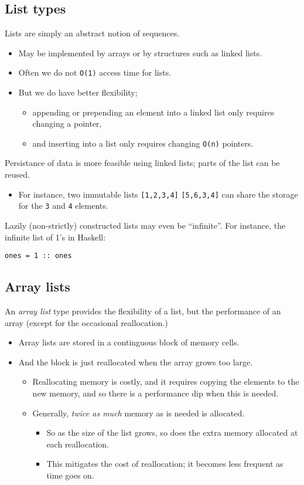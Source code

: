 \documentclass[11pt]{article}
\theoremstyle{definition}
\begin{document}
\subsection{List types}
\label{sec:org86a2905}

Lists are simply an abstract notion of sequences.
\begin{itemize}
\item May be implemented by arrays or by structures such as linked lists.
\item Often we do not \texttt{O(1)} access time for lists.
\item But we do have better flexibility;
\begin{itemize}
\item appending or prepending an element into a linked list
only requires changing a pointer,
\item and inserting into a list only requires changing \texttt{O(n)} pointers.
\end{itemize}
\end{itemize}

Persistance of data is more feasible using linked lists;
parts of the list can be reused.
\begin{itemize}
\item For instance, two immutable lists \texttt{[1,2,3,4]} \texttt{[5,6,3,4]} can share
the storage for the \texttt{3} and \texttt{4} elements.
\end{itemize}

Lazily (non-strictly) constructed lists may even be “infinite”.
For instance, the infinite list of 1's in Haskell:
\begin{verbatim}
ones = 1 :: ones
\end{verbatim}

\subsection{Array lists}
\label{sec:org1e6ac91}

An \emph{array list} type provides the flexibility of a list,
but the performance of an array (except for the occasional reallocation.)
\begin{itemize}
\item Array lists are stored in a continguous block of memory cells.
\item And the block is just reallocated when the array grows too large.
\begin{itemize}
\item Reallocating memory is costly,
and it requires copying the elements to the new memory,
and so there is a performance dip when this is needed.
\item Generally, \emph{twice as much} memory as is needed is allocated.
\begin{itemize}
\item So as the size of the list grows, so does the extra memory allocated
at each reallocation.
\item This mitigates the cost of reallocation; it becomes less frequent
as time goes on.
\end{itemize}
\end{itemize}
\end{itemize}
\end{document}
